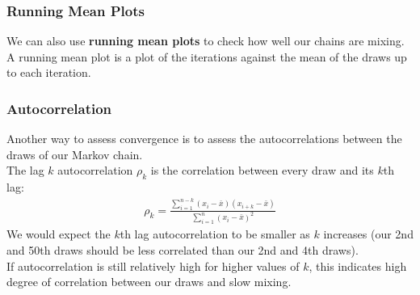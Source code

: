 \documentclass[handout]{beamer}
\begin{document}
\begin{frame}
\frametitle{Running Mean Plots}
\pause
We can also use \textbf{running mean plots} to check how well our
chains are mixing. \\
\pause
\bigskip
A running mean plot is a plot of the iterations against the mean of
the draws up to each iteration.
\pause

\begin{figure}[!htp]
\begin{center}
\end{center}
\end{figure}
\end{frame}

\begin{frame}
\frametitle{Autocorrelation}
\pause
Another way to assess convergence is to assess the autocorrelations
between the draws of our Markov chain.\\
\pause
\bigskip
The lag $k$ autocorrelation $\rho_k$ is the correlation between every draw and
its $k$th lag:
\pause
\begin{eqnarray*}
\rho_k = \frac{\sum_{i=1}^{n-k} (x_i - \bar{x})(x_{i+k} -
\bar{x})}{\sum_{i=1}^n (x_i - \bar{x})^2}
\end{eqnarray*}
\pause
We would expect the $k$th lag autocorrelation to be smaller as $k$
increases \pause (our 2nd and 50th draws should be less correlated
than our 2nd and 4th draws).\\
\pause
\bigskip
If autocorrelation is still relatively high for higher values of $k$,
this indicates high degree of correlation between our draws and slow mixing.
\end{frame}
\end{document}
